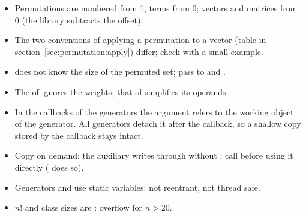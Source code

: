 \begin{itemize}
\item Permutations are numbered from 1,  terms from 0; vectors and matrices from 0 (the library subtracts the offset).
\item The two conventions of applying a permutation to a vector (table in section~\ref{sec:permutation:apply}) differ; check with a small example.
\item {} does not know the size of the permuted set; pass  to  and .
\item The  of  ignores the weights; that of  simplifies its operands.
\item In the callbacks of the generators the argument refers to the working object of the generator. All generators
	detach it after the callback, so a shallow copy stored by the callback stays intact.
\item Copy on demand: the auxiliary  writes through  without
	; call  before using it directly ( does so).
\item Generators and  use static variables: not reentrant, not thread safe.
\item $n!$ and class sizes are : overflow for $n>20$.
\end{itemize}
